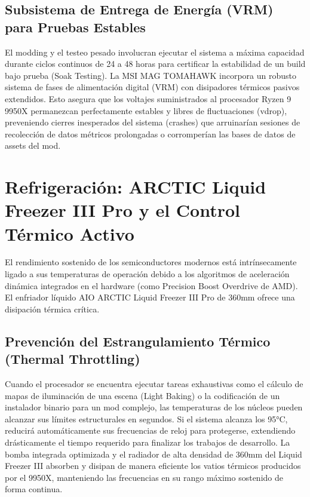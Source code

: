 \documentclass[12pt,a4paper]{article}
\begin{document}
\subsection{Subsistema de Entrega de Energía (VRM) para Pruebas Estables}
El modding y el testeo pesado involucran ejecutar el sistema a máxima capacidad durante ciclos continuos de 24 a 48 horas para certificar la estabilidad de un build bajo prueba (Soak Testing). La MSI MAG TOMAHAWK incorpora un robusto sistema de fases de alimentación digital (VRM) con disipadores térmicos pasivos extendidos. Esto asegura que los voltajes suministrados al procesador Ryzen 9 9950X permanezcan perfectamente estables y libres de fluctuaciones (vdrop), preveniendo cierres inesperados del sistema (crashes) que arruinarían sesiones de recolección de datos métricos prolongadas o corromperían las bases de datos de assets del mod.

\newpage

\section{Refrigeración: ARCTIC Liquid Freezer III Pro y el Control Térmico Activo}

El rendimiento sostenido de los semiconductores modernos está intrínsecamente ligado a sus temperaturas de operación debido a los algoritmos de aceleración dinámica integrados en el hardware (como Precision Boost Overdrive de AMD). El enfriador líquido AIO ARCTIC Liquid Freezer III Pro de 360mm ofrece una disipación térmica crítica.

\subsection{Prevención del Estrangulamiento Térmico (Thermal Throttling)}
Cuando el procesador se encuentra ejecutar tareas exhaustivas como el cálculo de mapas de iluminación de una escena (Light Baking) o la codificación de un instalador binario para un mod complejo, las temperaturas de los núcleos pueden alcanzar sus límites estructurales en segundos. Si el sistema alcanza los 95°C, reducirá automáticamente sus frecuencias de reloj para protegerse, extendiendo drásticamente el tiempo requerido para finalizar los trabajos de desarrollo. La bomba integrada optimizada y el radiador de alta densidad de 360mm del Liquid Freezer III absorben y disipan de manera eficiente los vatios térmicos producidos por el 9950X, manteniendo las frecuencias en su rango máximo sostenido de forma continua.
\end{document}

